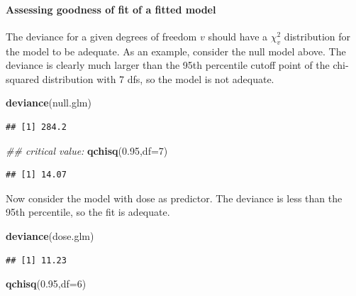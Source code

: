 \documentclass[12pt,]{krantz}
\newenvironment{Shaded}{\begin{snugshade}}{\end{snugshade}}
\newcommand{\CommentTok}[1]{\textcolor[rgb]{0.56,0.35,0.01}{\textit{#1}}}
\newcommand{\DataTypeTok}[1]{\textcolor[rgb]{0.13,0.29,0.53}{#1}}
\newcommand{\DecValTok}[1]{\textcolor[rgb]{0.00,0.00,0.81}{#1}}
\newcommand{\FloatTok}[1]{\textcolor[rgb]{0.00,0.00,0.81}{#1}}
\newcommand{\KeywordTok}[1]{\textcolor[rgb]{0.13,0.29,0.53}{\textbf{#1}}}
\newcommand{\NormalTok}[1]{#1}
\let\oldparagraph\paragraph
\renewcommand{\paragraph}[1]{\oldparagraph{#1}\mbox{}}
\begin{document}
\hypertarget{assessing-goodness-of-fit-of-a-fitted-model}{%
\paragraph{Assessing goodness of fit of a fitted model}\label{assessing-goodness-of-fit-of-a-fitted-model}}

The deviance for a given degrees of freedom \(v\) should have a \(\chi_v^2\) distribution for the model to be adequate. As an example, consider the null model above. The deviance is clearly much larger than the 95th percentile cutoff point of the chi-squared distribution with 7 dfs, so the model is not adequate.

\begin{Shaded}
\begin{Highlighting}[]
\KeywordTok{deviance}\NormalTok{(null.glm)}
\end{Highlighting}
\end{Shaded}

\begin{verbatim}
## [1] 284.2
\end{verbatim}

\begin{Shaded}
\begin{Highlighting}[]
\CommentTok{## critical value:}
\KeywordTok{qchisq}\NormalTok{(}\FloatTok{0.95}\NormalTok{,}\DataTypeTok{df=}\DecValTok{7}\NormalTok{)}
\end{Highlighting}
\end{Shaded}

\begin{verbatim}
## [1] 14.07
\end{verbatim}

Now consider the model with dose as predictor. The deviance is less than the 95th percentile, so the fit is adequate.

\begin{Shaded}
\begin{Highlighting}[]
\KeywordTok{deviance}\NormalTok{(dose.glm)}
\end{Highlighting}
\end{Shaded}

\begin{verbatim}
## [1] 11.23
\end{verbatim}

\begin{Shaded}
\begin{Highlighting}[]
\KeywordTok{qchisq}\NormalTok{(}\FloatTok{0.95}\NormalTok{,}\DataTypeTok{df=}\DecValTok{6}\NormalTok{)}
\end{Highlighting}
\end{Shaded}
\end{document}
